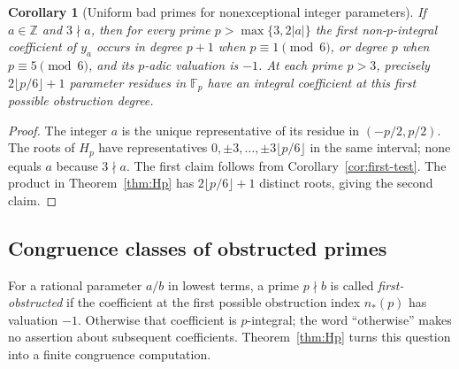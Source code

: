 \documentclass[11pt,a4paper,reqno]{amsart}
\newtheorem{corollary}[theorem]{Corollary}
\theoremstyle{definition}
\theoremstyle{remark}
\begin{document}
\begin{corollary}[Uniform bad primes for nonexceptional integer parameters]\label{cor:integer-primes}
If $a\in\mathbb Z$ and $3\nmid a$, then for every prime
$p>\max\{3,2|a|\}$ the first non-$p$-integral coefficient of $y_a$
occurs in degree $p+1$ when $p\equiv1\pmod6$, or degree $p$ when
$p\equiv5\pmod6$, and its $p$-adic valuation is $-1$.
At each prime $p>3$, precisely $2\lfloor p/6\rfloor+1$ parameter
residues in $\mathbb F_p$ have an integral coefficient at this first
possible obstruction degree.
\end{corollary}

\begin{proof}
The integer $a$ is the unique representative of its residue in
$(-p/2,p/2)$. The roots of $H_p$ have representatives
$0,\pm3,\ldots,\pm3\lfloor p/6\rfloor$ in the same interval;
none equals $a$ because $3\nmid a$. The first claim follows from
Corollary~\ref{cor:first-test}. The product in Theorem~\ref{thm:Hp}
has $2\lfloor p/6\rfloor+1$ distinct roots, giving the second claim.
\end{proof}


\subsection{Congruence classes of obstructed primes}

For a rational parameter $a/b$ in lowest terms, a prime $p\nmid b$
is called \emph{first-obstructed} if the coefficient at the first
possible obstruction index $n_*(p)$ has valuation $-1$.  Otherwise
that coefficient is $p$-integral; the word ``otherwise'' makes no
assertion about subsequent coefficients.  Theorem~\ref{thm:Hp}
turns this question into a finite congruence computation.
\end{document}
